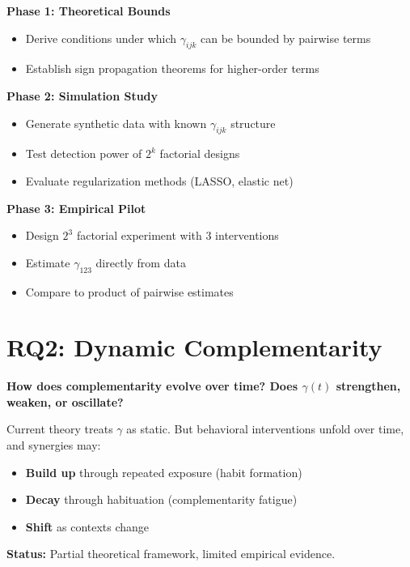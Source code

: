 \begin{tcolorbox}[colback=green!5!white,colframe=green!75!black,title=\textbf{Research Protocol for RQ1}]
\textbf{Phase 1: Theoretical Bounds}
\begin{itemize}[noitemsep]
    \item Derive conditions under which $\gamma_{ijk}$ can be bounded by pairwise terms
    \item Establish sign propagation theorems for higher-order terms
\end{itemize}

\textbf{Phase 2: Simulation Study}
\begin{itemize}[noitemsep]
    \item Generate synthetic data with known $\gamma_{ijk}$ structure
    \item Test detection power of $2^k$ factorial designs
    \item Evaluate regularization methods (LASSO, elastic net)
\end{itemize}

\textbf{Phase 3: Empirical Pilot}
\begin{itemize}[noitemsep]
    \item Design $2^3$ factorial experiment with 3 interventions
    \item Estimate $\gamma_{123}$ directly from data
    \item Compare to product of pairwise estimates
\end{itemize}
\end{tcolorbox}

\section{RQ2: Dynamic Complementarity}
\label{sec:rq2-dynamic}

\begin{tcolorbox}[colback=red!5!white,colframe=red!75!black,title=\textbf{Research Question 2}]
\textbf{How does complementarity evolve over time? Does $\gamma(t)$ strengthen, weaken, or oscillate?}

Current theory treats $\gamma$ as static. But behavioral interventions unfold over time, and synergies may:
\begin{itemize}[noitemsep]
    \item \textbf{Build up} through repeated exposure (habit formation)
    \item \textbf{Decay} through habituation (complementarity fatigue)
    \item \textbf{Shift} as contexts change
\end{itemize}

\textbf{Status:} Partial theoretical framework, limited empirical evidence.
\end{tcolorbox}

